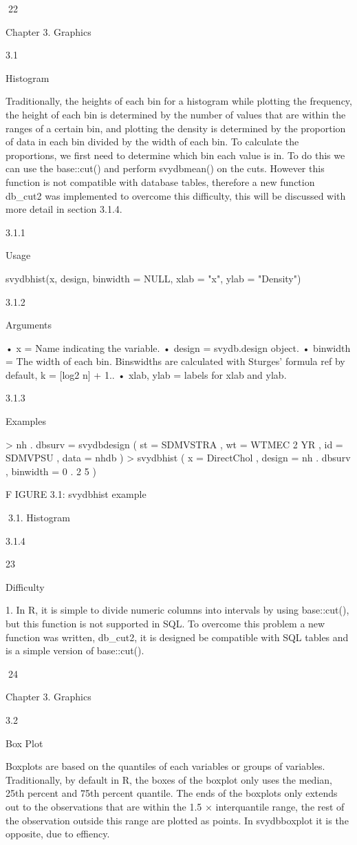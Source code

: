 22

Chapter 3. Graphics

3.1

Histogram

Traditionally, the heights of each bin for a histogram while plotting the frequency,
the height of each bin is determined by the number of values that are within the
ranges of a certain bin, and plotting the density is determined by the proportion of
data in each bin divided by the width of each bin.
To calculate the proportions, we first need to determine which bin each value is
in. To do this we can use the base::cut() and perform svydbmean() on the cuts.
However this function is not compatible with database tables, therefore a new function db_cut2 was implemented to overcome this difficulty, this will be discussed
with more detail in section 3.1.4.

3.1.1

Usage

svydbhist(x, design, binwidth = NULL, xlab = "x", ylab = "Density")

3.1.2

Arguments

• x = Name indicating the variable.
• design = svydb.design object.
• binwidth = The width of each bin. Binswidths are calculated with Sturges’
formula ref by default, k = [log2 n] + 1..
• xlab, ylab = labels for xlab and ylab.

3.1.3

Examples

> nh . dbsurv = svydbdesign ( st = SDMVSTRA , wt = WTMEC 2 YR ,
id = SDMVPSU , data = nhdb )
> svydbhist ( x = DirectChol , design = nh . dbsurv ,
binwidth = 0 . 2 5 )

F IGURE 3.1: svydbhist example

3.1. Histogram

3.1.4

23

Difficulty

1. In R, it is simple to divide numeric columns into intervals by using base::cut(),
but this function is not supported in SQL. To overcome this problem a new
function was written, db_cut2, it is designed be compatible with SQL tables
and is a simple version of base::cut().

24

Chapter 3. Graphics

3.2

Box Plot

Boxplots are based on the quantiles of each variables or groups of variables. Traditionally, by default in R, the boxes of the boxplot only uses the median, 25th percent
and 75th percent quantile. The ends of the boxplots only extends out to the observations that are within the 1.5 × interquantile range, the rest of the observation outside
this range are plotted as points. In svydbboxplot it is the opposite, due to effiency.

